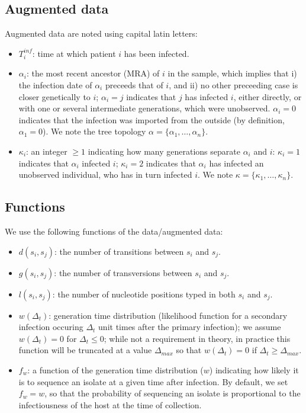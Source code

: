 \documentclass[10pt]{article}
\begin{document}
\subsection*{Augmented data}
Augmented data are noted using capital latin letters:
\begin{itemize}
	\item $T_i^{inf}$: time at which patient $i$ has been infected.
	\item $\alpha_i$: the most recent ancestor (MRA) of $i$ in the sample, which implies that i) the infection date of $\alpha_i$ preceeds that of $i$, and ii) no other preceeding case is closer genetically to $i$; $\alpha_i=j$ indicates that $j$ has infected $i$, either directly, or with one or several intermediate generations, which were unobserved. $\alpha_i=0$ indicates that the infection was imported from the outside (by definition,$\alpha_1=0$). 
We note the tree topology $\alpha = \{\alpha_1, \ldots, \alpha_n\}$.
 	\item $\kappa_i$: an integer $\geq 1$ indicating how many generations separate $\alpha_i$ and $i$: $\kappa_i=1$ indicates that $\alpha_i$ infected $i$; $\kappa_i=2$ indicates that $\alpha_i$ has infected an unobserved individual, who has in turn infected $i$.
We note $\kappa = \{\kappa_1, \ldots, \kappa_n\}$.

\end{itemize}




\subsection*{Functions}
We use the following functions of the data/augmented data:
\begin{itemize}
  \item $d(s_i,s_j)$: the number of transitions between $s_i$ and $s_j$.
  \item $g(s_i,s_j)$: the number of transversions between $s_i$ and $s_j$.
  \item $l(s_i,s_j)$: the number of nucleotide positions typed in both $s_i$ and $s_j$.
  \item $w(\Delta_t)$: generation time distribution (likelihood function for a secondary infection occuring $\Delta_t$ unit times after the primary infection); we assume $w(\Delta_t)=0$ for $\Delta_t \leq 0$; while not a requirement in theory, in practice this function will be truncated at a value $\Delta_{max}$ so that $w(\Delta_t)=0$ if $\Delta_t \geq \Delta_{max}$.
  \item $f_w$: a function of the generation time distribution ($w$) indicating how likely it is to sequence an isolate at a given time after infection. By default, we set $f_w=w$, so that the probability of sequencing an isolate is proportional to the infectiousness of the host at the time of collection.
\end{itemize}
\end{document}
